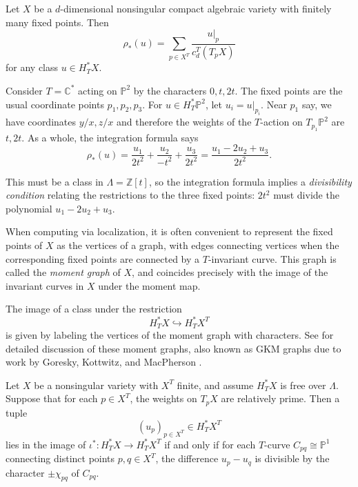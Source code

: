 \begin{theorem}
	Let $X$ be a $d$-dimensional nonsingular compact algebraic variety with finitely many fixed points. Then
	\[
		\rho_*(u) = \sum_{p \in X^T} \frac{u|_p}{c_d^T(T_p X)}
	\]
	for any class $u \in H^*_T X$.
\end{theorem}

\begin{example}
	Consider $T = \mathbb{C}^*$ acting on $\mathbb{P}^2$ by the characters $0, t, 2t$. The fixed points are the usual coordinate points $p_1, p_2, p_3$. For $u \in H^*_T \mathbb{P}^2$, let $u_i = u|_{p_i}$. Near $p_1$ say, we have coordinates $y/x, z/x$ and therefore the weights of the $T$-action on $T_{p_1} \mathbb{P}^2$ are $t, 2t$. As a whole, the integration formula says
	\[
		\rho_*(u) = \frac{u_1}{2t^2} + \frac{u_2}{-t^2} + \frac{u_3}{2t^2} = \frac{u_1 - 2u_2 + u_3}{2t^2}.
	\]

	This must be a class in $\Lambda = \mathbb{Z}[t]$, so the integration formula implies a \textit{divisibility condition} relating the restrictions to the three fixed points: $2t^2$ must divide the polynomial $u_1 - 2u_2 + u_3$.
\end{example}

When computing via localization, it is often convenient to represent the fixed points of $X$ as the vertices of a graph, with edges connecting vertices when the corresponding fixed points are connected by a $T$-invariant curve. This graph is called the \textit{moment graph} of $X$, and coincides precisely with the image of the invariant curves in $X$ under the moment map.

The image of a class under the restriction
\[
	H^*_T X \hookrightarrow H^*_T X^T
\]
is given by labeling the vertices of the moment graph with characters. See \cite{hhh} for detailed discussion of these moment graphs, also known as GKM graphs due to work by Goresky, Kottwitz, and MacPherson \cite{gkm}.

\begin{theorem}
	[GKM]Let \( X \) be a nonsingular variety with \( X^T \) finite, and assume \( H_T^*X \) is free over \( \Lambda \). Suppose that for each \( p \in X^T \), the weights on \( T_pX \) are relatively prime. Then a tuple
	\[
		(u_p)_{p \in X^T} \in H_T^*X^T
	\]
	lies in the image of \( \iota^* : H_T^*X \to H_T^*X^T \) if and only if for each \( T\)-curve \( C_{pq} \cong \mathbb{P}^1 \) connecting distinct points \( p, q \in X^T \), the difference \( u_p - u_q \) is divisible by the character \( \pm \chi_{pq} \) of \( C_{pq} \).
\end{theorem}

